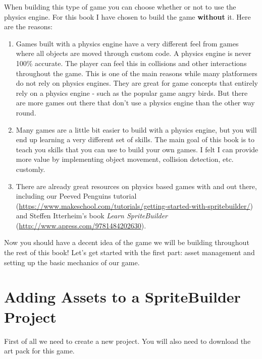 When building this type of game you can choose whether or not to use the
\cocos{} physics engine. For this book I have chosen to build the game
\textbf{without} it. Here are the reasons:
\begin{enumerate}
  \item Games built with a physics engine have a very different feel from games
  where all objects are moved through custom code. A physics engine is never
  100\% accurate. The player can feel this in collisions and other interactions
  throughout the game. This is one of the main reasons while many platformers do
  not rely on physics engines. They are great for game concepts that entirely
  rely on a physics engine - such as the popular game angry birds. But there are
  more games out there that don't use a physics engine than the other way
  round.
  \item Many games are a little bit easier to build with a physics engine, but
  you will end up learning a very different set of skills. The main goal of this
  book is to teach you skills that you can use to build your own games. I felt I
  can provide more value by implementing object movement, collision detection,
  etc. customly.
  \item There are already great resources on physics based games with \SB{} and
  \cocos{} out there, including our Peeved Penguins tutorial
  (\url{https://www.makeschool.com/tutorials/getting-started-with-spritebuilder/}) and 
  Steffen Itterheim's book \textit{Learn SpriteBuilder}
  (\url{http://www.apress.com/9781484202630}).
\end{enumerate}

Now you should have a decent idea of the game we will be building throughout the
rest of this book! Let's get started with the first part: asset
management and setting up the basic mechanics of our game.

\section{Adding Assets to a SpriteBuilder Project}
First of all we need to create a new \SB{} project. You will also need to
download the art pack for this game.

